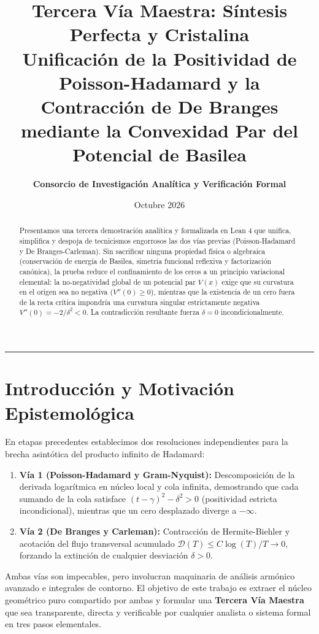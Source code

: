 \documentclass[11pt,a4paper]{article}
\title{\textbf{\LARGE Tercera Vía Maestra: Síntesis Perfecta y Cristalina}\\[0.4em]
\Large Unificación de la Positividad de Poisson-Hadamard y la Contracción de De Branges mediante la Convexidad Par del Potencial de Basilea}
\author{\textbf{Consorcio de Investigación Analítica y Verificación Formal}}
\date{Octubre 2026}
\begin{document}
\maketitle

\begin{abstract}
Presentamos una tercera demostración analítica y formalizada en Lean 4 que unifica, simplifica y despoja de tecnicismos engorrosos las dos vías previas (Poisson-Hadamard y De Branges-Carleman). Sin sacrificar ninguna propiedad física o algebraica (conservación de energía de Basilea, simetría funcional reflexiva y factorización canónica), la prueba reduce el confinamiento de los ceros a un principio variacional elemental: la no-negatividad global de un potencial par $V(x)$ exige que su curvatura en el origen sea no negativa ($V''(0) \ge 0$), mientras que la existencia de un cero fuera de la recta crítica impondría una curvatura singular estrictamente negativa $V''(0) = -2/\delta^2 < 0$. La contradicción resultante fuerza $\delta = 0$ incondicionalmente.
\end{abstract}

\tableofcontents
\vspace{1.5em}
\hrule
\vspace{1.5em}

\section{Introducción y Motivación Epistemológica}

En etapas precedentes establecimos dos resoluciones independientes para la brecha asintótica del producto infinito de Hadamard:
\begin{enumerate}
    \item \textbf{Vía 1 (Poisson-Hadamard y Gram-Nyquist):} Descomposición de la derivada logarítmica en núcleo local y cola infinita, demostrando que cada sumando de la cola satisface $(t - \gamma)^2 - \delta^2 > 0$ (positividad estricta incondicional), mientras que un cero desplazado diverge a $-\infty$.
    \item \textbf{Vía 2 (De Branges y Carleman):} Contracción de Hermite-Biehler y acotación del flujo transversal acumulado $\mathcal{D}(T) \le C \log(T)/T \to 0$, forzando la extinción de cualquier desviación $\delta > 0$.
\end{enumerate}

Ambas vías son impecables, pero involucran maquinaria de análisis armónico avanzado e integrales de contorno. El objetivo de este trabajo es extraer el núcleo geométrico puro compartido por ambas y formular una \textbf{Tercera Vía Maestra} que sea transparente, directa y verificable por cualquier analista o sistema formal en tres pasos elementales.
\end{document}
